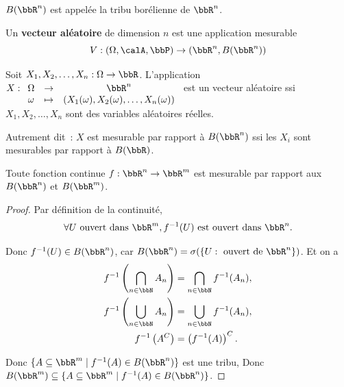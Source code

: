 $B(\bbR^n)$ est appelée la tribu borélienne de $\bbR^n$.

\begin{deff}
    Un \textbf{vecteur aléatoire} de dimension $n$ est une application mesurable
    \[ V: (\Omega, \calA, \bbP) \to (\bbR^n, B(\bbR^n)) \]
\end{deff}

\begin{thm}
    Soit $X_1, X_2, \ldots, X_n: \Omega \to \bbR$.
    L'application $X:
        \begin{array}[t]{ccc}
            \Omega & \to & \bbR^n                                                     \\
            \omega & \tp & \left(X_1(\omega), X_2(\omega), \ldots, X_n(\omega)\right)
        \end{array}
    $ est un vecteur aléatoire
    ssi $X_1, X_2, \ldots, X_n$ sont des variables aléatoires réelles.
\end{thm}

\begin{rqq}
    Autrement dit~:
    $X$ est mesurable par rapport à $B(\bbR^n)$ ssi les $X_i$ sont mesurables par rapport à $B(\bbR)$.
\end{rqq}

\begin{lem}
    Toute fonction continue $f: \bbR^n \to \bbR^m$ est mesurable par rapport aux $B(\bbR^n)$ et $B(\bbR^m)$.
\end{lem}

\begin{proof}
    Par définition de la continuité,
    \[ \forall U \text{ ouvert dans } \bbR^m, f^{-1}(U) \text{ est ouvert dans } \bbR^n. \]

    Donc $f^{-1}(U) \in B(\bbR^n)$,
    car $B(\bbR^n) = \sigma(\{ U: \text{ ouvert de } \bbR^n \})$.
    Et on a
    \begin{align*}
        f^{-1}\left(\bigcap_{n \in \bbN} A_n\right) & = \bigcap_{n \in \bbN} f^{-1}(A_n), \\
        f^{-1}\left(\bigcup_{n \in \bbN} A_n\right) & = \bigcup_{n \in \bbN} f^{-1}(A_n), \\
        f^{-1}\left(A^C\right)                      & = \left(f^{-1}(A)\right)^C.
    \end{align*}

    Donc $\{ A \subseteq \bbR^m \mid f^{-1}(A) \in B(\bbR^n) \}$ est une tribu,
    Donc $B(\bbR^m) \subseteq \{ A \subseteq \bbR^m \mid f^{-1}(A) \in B(\bbR^n) \}$.
\end{proof}

